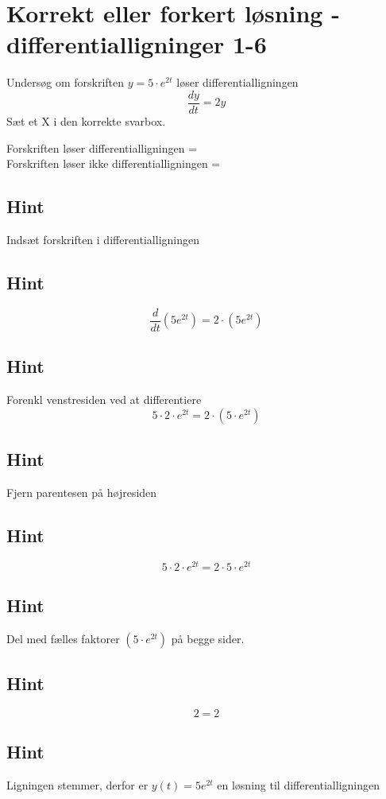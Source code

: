\documentclass{article}
\newenvironment{exercise}[1]{\newpage\section{#1}}{}
\newcommand{\answerbox}[1]{\fbox{$#1$}}
\newcommand{\hint}{\subsection*{Hint}}
\begin{document}
\begin{exercise}{Korrekt eller forkert løsning - differentialligninger 1-6}
	
	
	Undersøg om forskriften $y = 5 \cdot e^{2t}$ løser differentialligningen
	\[
	\frac{dy}{dt} = 2y
	\]
	Sæt et X i den korrekte svarbox.
	
	Forskriften løser differentialligningen = \answerbox{X} \\
	
	Forskriften løser ikke differentialligningen = \answerbox{}
	
	\hint
	
	Indsæt forskriften i differentialligningen
	
	\hint
	\[
	\frac{d}{dt} \left( 5 e^{2t}\right) = 2 \cdot \left( 5 e^{2t} \right)
	\]
	
	
	\hint
	
	Forenkl venstresiden ved at differentiere
	\[
	5 \cdot 2 \cdot e^{2t} = 2 \cdot \left(5 \cdot e^{2t} \right)
	\]
	
	\hint
	
	Fjern parentesen på højresiden
	
	\hint
	\[
	5 \cdot 2 \cdot e^{2t} = 2 \cdot 5 \cdot e^{2t}
	\]
	
	\hint
	Del med fælles faktorer $\left( 5 \cdot e^{2t} \right)$ på begge sider.
	
	\hint
	
	\[
	2 = 2
	\]
	
	
	\hint
	
	Ligningen stemmer, derfor er $y(t) = 5 e^{2t}$ en løsning til differentialligningen
	
\end{exercise}

\newpage
\end{document}
